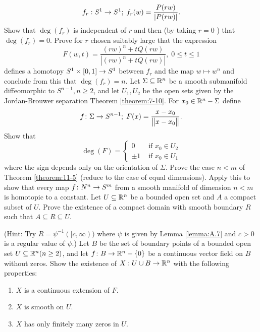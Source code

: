 \begin{enumerate}[label=\theexercise.\arabic*.,ref=\theexercise.\arabic*,leftmargin=2.7em]
    \[
      {f}_{r} : {S}^{1} \rightarrow  {S}^{1};\;{f}_{r}( w)  = \frac{P( {rw}) }{\left| P( rw) \right| }.
    \]
    Show that $\deg ( {f}_{r})$ is independent of $r$ and then (by taking $r = 0$ ) that $\deg ( {f}_{r})  = 0$. Prove for $r$ chosen suitably large that the expression
    \[
      F( {w,t})  = \frac{{( rw) }^{n} + {tQ}( {rw}) }{\left| {( rw) }^{n} + tQ( rw) \right| },\;0 \leq  t \leq  1
    \]
    defines a homotopy ${S}^{1} \times  [  {0,1}]   \rightarrow  {S}^{1}$ between ${f}_{r}$ and the map $w \mapsto  {w}^{n}$ and conclude from this that $\deg ( {f}_{r})  = n$.
  \NewItem Let $\Sigma \subseteq  {\ensuremath{\mathbb{R}}}^{n}$ be a smooth submanifold diffeomorphic to ${S}^{n- 1},n \geq  2$, and let ${U}_{1},{U}_{2}$ be the open sets given by the Jordan-Brouwer separation Theorem \ref{theorem:7-10}. For ${x}_{0} \in  {\ensuremath{\mathbb{R}}}^{n}- \Sigma$ define
    \[
      f\colon \Sigma  \rightarrow  {S}^{n- 1};\;F( x)  = \frac{x- {x}_{0}}{\begin{Vmatrix}x- {x}_{0}\end{Vmatrix}}.
    \]
    Show that
    \[
      \deg ( F)  = \left\{  \begin{array}{ll} 0 & \text{ if }{x}_{0} \in  {U}_{2} \\   \pm  1 & \text{ if }{x}_{0} \in  {U}_{1} \end{array}\right.
    \]
    where the sign depends only on the orientation of $\Sigma$.
  \NewItem Prove the case $n < m$ of Theorem \ref{theorem:11-5} (reduce to the case of equal dimensions).
    Apply this to show that every map $f\colon {N}^{n} \rightarrow  {S}^{m}$ from a smooth manifold of dimension $n < m$ is homotopic to a constant.
  \NewItem Let $U \subseteq  {\ensuremath{\mathbb{R}}}^{n}$ be a bounded open set and $A$ a compact subset of $U$. Prove the existence of a compact domain with smooth boundary $R$ such that $A \subseteq  R \subseteq  U$.
    \par(Hint: Try $R = {\psi }^{-1}( {\lbrack c,\infty }) )$ where $\psi$ is given by Lemma \ref{lemma:A.7} and $c > 0$ is a regular value of $\psi$.)
  \NewItem Let $B$ be the set of boundary points of a bounded open set $U \subseteq  {\ensuremath{\mathbb{R}}}^{n}( {n \geq  2})$, and let $f\colon B \rightarrow  {\ensuremath{\mathbb{R}}}^{n}- \{ 0\}$ be a continuous vector field on $B$ without zeros. Show the existence of $X : U \cup  B \rightarrow  {\ensuremath{\mathbb{R}}}^{n}$ with the following properties:
    \begin{enumerate}
      \item $X$ is a continuous extension of $F$.
      \item $X$ is smooth on $U$.
      \item $X$ has only finitely many zeros in $U$.

\end{enumerate}
\end{enumerate}
